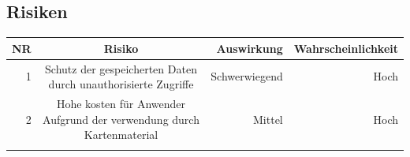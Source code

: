\documentclass[ngerman,]{article}
\begin{document}
\subsection{Risiken}\label{risiken}

\begin{longtable}[]{@{}rcrr@{}}
\toprule
\begin{minipage}[b]{0.06\columnwidth}\raggedleft\strut
\textbf{NR}\strut
\end{minipage} & \begin{minipage}[b]{0.50\columnwidth}\centering\strut
\textbf{Risiko}\strut
\end{minipage} & \begin{minipage}[b]{0.14\columnwidth}\raggedleft\strut
\textbf{Auswirkung}\strut
\end{minipage} & \begin{minipage}[b]{0.19\columnwidth}\raggedleft\strut
\textbf{Wahrscheinlichkeit}\strut
\end{minipage}\tabularnewline
\midrule
\endhead
\begin{minipage}[t]{0.06\columnwidth}\raggedleft\strut
1\strut
\end{minipage} & \begin{minipage}[t]{0.50\columnwidth}\centering\strut
Schutz der gespeicherten Daten durch unauthorisierte Zugriffe\strut
\end{minipage} & \begin{minipage}[t]{0.14\columnwidth}\raggedleft\strut
Schwerwiegend\strut
\end{minipage} & \begin{minipage}[t]{0.19\columnwidth}\raggedleft\strut
Hoch\strut
\end{minipage}\tabularnewline
\begin{minipage}[t]{0.06\columnwidth}\raggedleft\strut
2\strut
\end{minipage} & \begin{minipage}[t]{0.50\columnwidth}\centering\strut
Hohe kosten für Anwender Aufgrund der verwendung durch
Kartenmaterial\strut
\end{minipage} & \begin{minipage}[t]{0.14\columnwidth}\raggedleft\strut
Mittel\strut
\end{minipage} & \begin{minipage}[t]{0.19\columnwidth}\raggedleft\strut
Hoch\strut
\end{minipage}\tabularnewline
\begin{minipage}[t]{0.06\columnwidth}\raggedleft\strut

\end{minipage}
\end{longtable}
\end{document}
